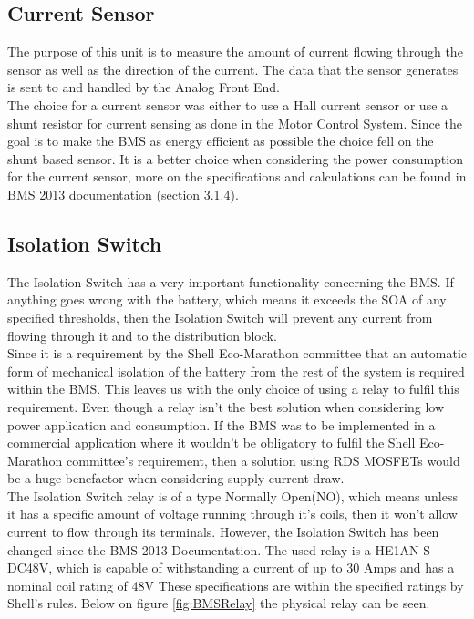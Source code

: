 \subsection{Current Sensor}
The purpose of this unit is to measure the amount of current flowing through the sensor as well as the direction of the current. The data that the sensor generates is sent to and handled by the Analog Front End. \\
The choice for a current sensor was either to use a Hall current sensor or use a shunt resistor for current sensing as done in the Motor Control System. Since the goal is to make the BMS as energy efficient as possible the choice fell on the shunt based sensor. It is a better choice when considering the power consumption for the current sensor, more on the specifications and calculations can be found in BMS 2013 documentation \cite{BMSDocumentation} (section 3.1.4).

\subsection{Isolation Switch}
\label{sec:IsoSwitch}
The Isolation Switch has a very important functionality concerning the BMS. If anything goes wrong with the battery, which means it exceeds the SOA of any specified thresholds, then the Isolation Switch will prevent any current from flowing through it and to the distribution block. \\
Since it is a requirement by the Shell Eco-Marathon committee that an automatic form of mechanical isolation of the battery from the rest of the system is required within the BMS. This leaves us with the only choice of using a relay to fulfil this requirement. Even though a relay isn't the best solution when considering low power application and consumption. If the BMS was to be implemented in a commercial application where it wouldn't be obligatory to fulfil the Shell Eco-Marathon committee's requirement, then a solution using RDS MOSFETs would be a huge benefactor when considering supply current draw.\\
The Isolation Switch relay is of a type Normally Open(NO), which means unless it has a specific amount of voltage running through it's coils, then it won't allow current to flow through its terminals. However, the Isolation Switch has been changed since the BMS 2013 Documentation\cite{BMSDocumentation}. The used relay is a HE1AN-S-DC48V\cite{BMSRelay}, which is capable of withstanding a current of up to 30 Amps and has a nominal coil rating of 48V These specifications are within the specified ratings by Shell's rules\cite{ShellRequirements}. Below on figure \vref{fig:BMSRelay} the physical relay can be seen.


